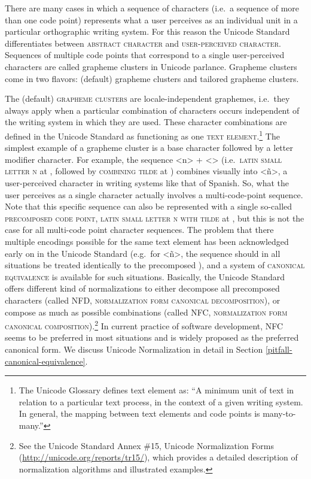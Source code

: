 There are many cases in which a sequence of characters (i.e.~a sequence of more
than one code point) represents what a user perceives as an individual unit in a
particular orthographic writing system. For this reason the Unicode Standard
differentiates between \textsc{abstract character} and \textsc{user-perceived
character}. Sequences of multiple code points that correspond to a single
user-perceived characters are called grapheme clusters in Unicode parlance.
Grapheme clusters come in two flavors: (default) grapheme clusters and tailored
grapheme clusters.

The (default) \textsc{grapheme clusters} are locale-independent graphemes,
i.e.~they always apply when a particular combination of characters occurs
independent of the writing system in which they are used. These character
combinations are defined in the Unicode Standard as functioning as one
\textsc{text element}.\footnote{The Unicode Glossary defines text element as:
``A minimum unit of text in relation to a particular text process, in the
context of a given writing system. In general, the mapping between text elements
and code points is many-to-many.''} The simplest example of a grapheme cluster
is a base character followed by a letter modifier character. For example, the
sequence <n> + <> (i.e.~\textsc{latin small letter n} at , followed
by \textsc{combining tilde} at ) combines visually into <ñ>, a
user-perceived character in writing systems like that of Spanish. So, what the
user perceives as a single character actually involves a multi-code-point
sequence. Note that this specific sequence can also be represented with a single
so-called \textsc{precomposed code point}, \textsc{latin small letter n with
tilde} at , but this is not the case for all multi-code point
character sequences. The problem that there multiple encodings possible for the
same text element has been acknowledged early on in the Unicode Standard
(e.g.~for <ñ>, the sequence   should in all situations be
treated identically to the precomposed ), and a system of
\textsc{canonical equivalence} is available for such situations. Basically, the
Unicode Standard offers different kind of normalizations to either decompose all
precomposed characters (called \textsc{NFD}, \textsc{normalization form
canonical decomposition}), or compose as much as possible combinations (called
\textsc{NFC}, \textsc{normalization form canonical composition}).\footnote{See the 
Unicode Standard Annex \#15, Unicode Normalization Forms (\url{http://unicode.org/reports/tr15/}), 
which provides a detailed description of normalization algorithms and illustrated examples.} 
In current practice of software development, NFC seems to be preferred in most situations
and is widely proposed as the preferred canonical form. We discuss Unicode Normalization 
in detail in Section \ref{pitfall-canonical-equivalence}.


